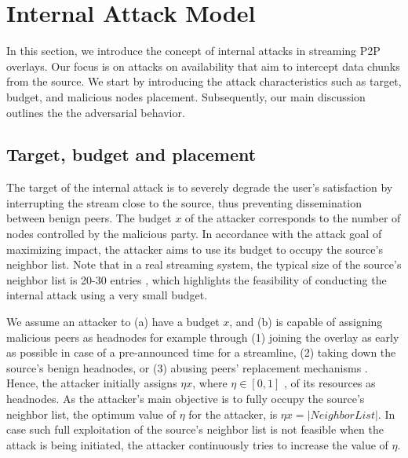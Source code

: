 \section{Internal Attack Model}
\label{sec:Attack}

In this section, we introduce the concept of internal attacks in streaming P2P overlays.
Our focus is on attacks on availability that aim to intercept data chunks from the source. 
We start by introducing the attack characteristics such as target, budget, and malicious nodes placement. 
Subsequently, our main discussion outlines the the \drop adversarial behavior. 

\subsection{Target, budget and placement}


The target of the internal attack is to severely degrade the user's satisfaction by interrupting the stream close to the source, thus preventing dissemination between benign peers.
The budget $x$ of the attacker corresponds to the number of nodes controlled by the malicious party. 
In accordance with the attack goal of maximizing impact, the attacker aims to use its budget to occupy the source's neighbor list. 
Note that in a real streaming system, the typical size of the source's neighbor list is 20-30 entries \cite{neighborlist1,neighborlist2}, which highlights the feasibility of conducting the internal attack using a very small budget.

We assume an attacker to (a) have a budget $x$, and (b) is capable of assigning malicious peers as headnodes for example through (1) joining the overlay as early as possible in case of a pre-announced time for a streamline, (2) taking down the source's benign headnodes, or (3) abusing peers' replacement mechanisms \cite{nguyen2016swap}.
Hence, the attacker initially assigns $\eta x$, where $\eta\in [0,1]$ , of its resources as headnodes.
As the attacker's main objective is to fully occupy the source's neighbor list, the optimum value of $\eta$ for the attacker, is $\eta x = |NeighborList|$.
In case such full exploitation of the source's neighbor list is not feasible when the attack is being initiated, the attacker continuously tries to increase the value of $\eta$.  

